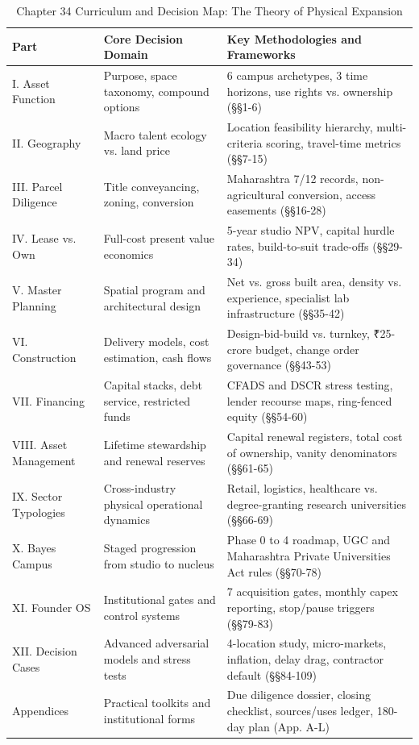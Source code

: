 \begin{table}[t]
\centering
\small
\caption{Chapter 34 Curriculum and Decision Map: The Theory of Physical Expansion}
\label{tab:ch34_reading_map}
\begin{tabularx}{\textwidth}{p{3.2cm} p{5.5cm} X}
\toprule
\textbf{Part} & \textbf{Core Decision Domain} & \textbf{Key Methodologies and Frameworks} \\
\midrule
I. Asset Function & Purpose, space taxonomy, compound options & 6 campus archetypes, 3 time horizons, use rights vs. ownership (§§1-6) \\
II. Geography & Macro talent ecology vs. land price & Location feasibility hierarchy, multi-criteria scoring, travel-time metrics (§§7-15) \\
III. Parcel Diligence & Title conveyancing, zoning, conversion & Maharashtra 7/12 records, non-agricultural conversion, access easements (§§16-28) \\
IV. Lease vs. Own & Full-cost present value economics & 5-year studio NPV, capital hurdle rates, build-to-suit trade-offs (§§29-34) \\
V. Master Planning & Spatial program and architectural design & Net vs. gross built area, density vs. experience, specialist lab infrastructure (§§35-42) \\
VI. Construction & Delivery models, cost estimation, cash flows & Design-bid-build vs. turnkey, \textnormal{₹}25-crore budget, change order governance (§§43-53) \\
VII. Financing & Capital stacks, debt service, restricted funds & CFADS and DSCR stress testing, lender recourse maps, ring-fenced equity (§§54-60) \\
VIII. Asset Management & Lifetime stewardship and renewal reserves & Capital renewal registers, total cost of ownership, vanity denominators (§§61-65) \\
IX. Sector Typologies & Cross-industry physical operational dynamics & Retail, logistics, healthcare vs. degree-granting research universities (§§66-69) \\
X. Bayes Campus & Staged progression from studio to nucleus & Phase 0 to 4 roadmap, UGC and Maharashtra Private Universities Act rules (§§70-78) \\
XI. Founder OS & Institutional gates and control systems & 7 acquisition gates, monthly capex reporting, stop/pause triggers (§§79-83) \\
XII. Decision Cases & Advanced adversarial models and stress tests & 4-location study, micro-markets, inflation, delay drag, contractor default (§§84-109) \\
Appendices & Practical toolkits and institutional forms & Due diligence dossier, closing checklist, sources/uses ledger, 180-day plan (App. A-L) \\
\bottomrule
\end{tabularx}
\end{table}

